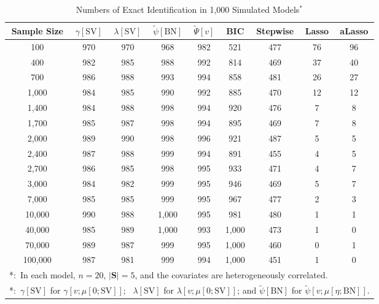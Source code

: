 \documentclass[a4paper,12pt]{article}
\begin{document}
\begin{table}
\caption{Numbers of Exact Identification in 1,000 Simulated Models$^*$}
\label{tb:samplesize}
\centering
\begin{tabular}{c || c |c |c |c |c |c |c |c}
\hline \hline
Sample Size& $\gamma[\mathrm{SV}]$& $\lambda[\mathrm{SV}]$& $\tilde\psi[\mathrm{BN}]$ & $\tilde\Psi[v]$& BIC & Stepwise& Lasso& aLasso \\ \hline
100&  970&  970&  968&  982&  521&  477&  76&  96\\
400&  982&  985&  988&  992&  814&  469&  37&  40\\
700&  986&  988&  993&  994&  858&  481&  26&  27\\
1,000&  984&  985&  990&  992&  885&  470&  12&  12\\
1,400&  984&  988&  998&  994&  920&  476&  7&  8\\
1,700&  985&  987&  998&  994&  895&  469&  7&  8\\
2,000&  989&  990&  998&  996&  921&  487&  5&  5\\
2,400&  987&  988&  999&  994&  891&  455&  4&  5\\
2,700&  986&  985&  998&  995&  933&  471&  4&  7\\
3,000&  984&  982&  999&  995&  946&  469&  5&  7\\
7,000&  985&  985&  999&  995&  967&  477&  2&  3\\
10,000&  990&  988&  1,000&  995& 981&  480&  1&  1\\
40,000&  985&  989&  1,000&  993&  1,000&  473&  1& 0\\
70,000&  989&  987&  999&  995&  1,000&  460&  0& 1\\
100,000&  987&  981&  999&  994&  1,000&  451&  1& 0\\ \hline \hline
\multicolumn{9}{l}{\small{*:\ In each model, $n=20$, $|\mathbf{S}|=5$, and the covariates are heterogeneously correlated.}}  \\
\multicolumn{9}{l}{\small{*:\ $\gamma[\mathrm{SV}]$ for $\gamma[v;\mu[0;\mathrm{SV}]]$; \ $\lambda[\mathrm{SV}]$ for $\lambda[v;\mu[0;\mathrm{SV}]]$; and $\tilde\psi[\mathrm{BN}]$ for $\tilde\psi[v;\mu[\eta;\mathrm{BN}]]$.}}  \\
\end{tabular}
\end{table}
\end{document}
